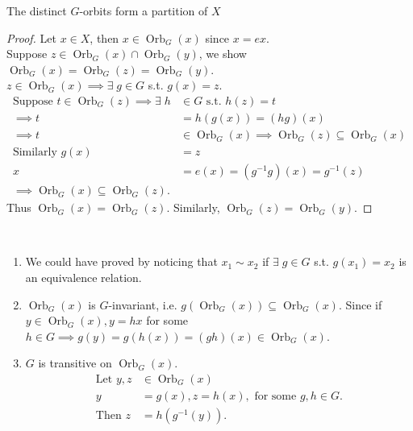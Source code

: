 \begin{lemma} \label{lem:17}
    The distinct $G$-orbits form a partition of $X$
\end{lemma} 

\begin{proof}
    Let $x \in X$, then $x \in \operatorname{Orb}_G(x)$ since $x = ex$. \\
    Suppose $z \in \operatorname{Orb}_G(x) \cap \operatorname{Orb}_G(y)$, we show $\operatorname{Orb}_G(x) = \operatorname{Orb}_G(z) = \operatorname{Orb}_G(y)$. \\
    $z \in \operatorname{Orb}_G(x) \implies \exists \; g \in G$ s.t. $g(x) = z$.
    \begin{align*}
        \text{Suppose } t \in \operatorname{Orb}_G(z) \implies \exists \; h &\in G \text{ s.t. } h(z) = t \\
        \implies t &= h(g(x)) = (hg)(x) \\
        \implies t &\in \operatorname{Orb}_G(x)
        \implies \operatorname{Orb}_G(z) \subseteq \operatorname{Orb}_G(x) \\
        \text{Similarly } g(x) &= z \\
        x &= e(x) = (g^{-1} g)(x) = g^{-1}(z) \\
        \implies \operatorname{Orb}_G(x) \subseteq \operatorname{Orb}_G(z).
    \end{align*} 
    Thus $\operatorname{Orb}_G(x) = \operatorname{Orb}_G(z)$.
    Similarly, $\operatorname{Orb}_G(z) = \operatorname{Orb}_G(y)$.
\end{proof} 

\begin{remark} ~
    \begin{enumerate}
        \item We could have proved  by noticing that $x_1 \sim x_2$ if $\exists \; g \in G$ s.t. $g(x_1) = x_2$ is an equivalence relation.
        \item $\operatorname{Orb}_G(x)$ is $G$-invariant, i.e. $g \left( \operatorname{Orb}_G(x) \right) \subseteq \operatorname{Orb}_G(x)$.
        Since if $y \in \operatorname{Orb}_G(x), y = hx$ for some $h \in G \implies g(y) = g(h(x)) = (gh)(x) \in \operatorname{Orb}_G(x)$.
        \item $G$ is transitive on $\operatorname{Orb}_G(x)$.
        \begin{align*}
            \text{Let } y, z &\in \operatorname{Orb}_G(x) \\
            y &= g(x), z = h(x), \text{ for some } g, h \in G. \\
            \text{Then } z &= h(g^{-1}(y)).
        \end{align*} 
    \end{enumerate} 
\end{remark} 

